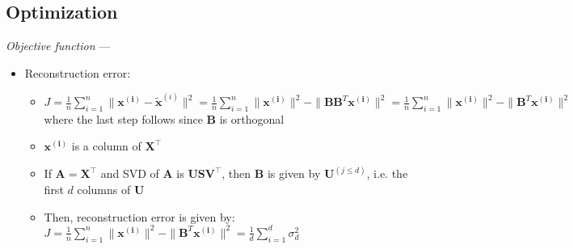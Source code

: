 \subsection*{Optimization}
\emph{Objective function} ---
\begin{itemize}
    \item Reconstruction error:
    \begin{itemize}
        \item $J = \frac{1}{n} \sum_{i=1}^n \| \boldsymbol{x^{(i)}} - \tilde{\boldsymbol{x}}^{(i)} \|^2 = \frac{1}{n} \sum_{i=1}^n \| \boldsymbol{x^{(i)}} \|^2 - \| \boldsymbol{B}\boldsymbol{B}^T \boldsymbol{x^{(i)}} \|^2 = \frac{1}{n} \sum_{i=1}^n \| \boldsymbol{x^{(i)}} \|^2 - \| \boldsymbol{B}^T \boldsymbol{x^{(i)}} \|^2 $ where the last step follows since $\boldsymbol{B}$  is orthogonal
        \item $\boldsymbol{x^{(i)}}$ is a column of $\boldsymbol{X}^\intercal$
        \item If $\boldsymbol{A} = \boldsymbol{X}^\intercal$ and SVD of $\boldsymbol{A}$ is $\boldsymbol{U}\boldsymbol{S}\boldsymbol{V}^\intercal$, then $\boldsymbol{B}$ is given by $\boldsymbol{U}^{(j \leq d)}$, i.e. the first $d$ columns of $\boldsymbol{U}$
        \item Then, reconstruction error is given by: $J = \frac{1}{n} \sum_{i=1}^n \| \boldsymbol{x^{(i)}} \|^2 - \| \boldsymbol{B}^T \boldsymbol{x^{(i)}} \|^2 = \frac{1}{d} \sum_{i=1}^d \sigma_d^2$
    \end{itemize}
\end{itemize}